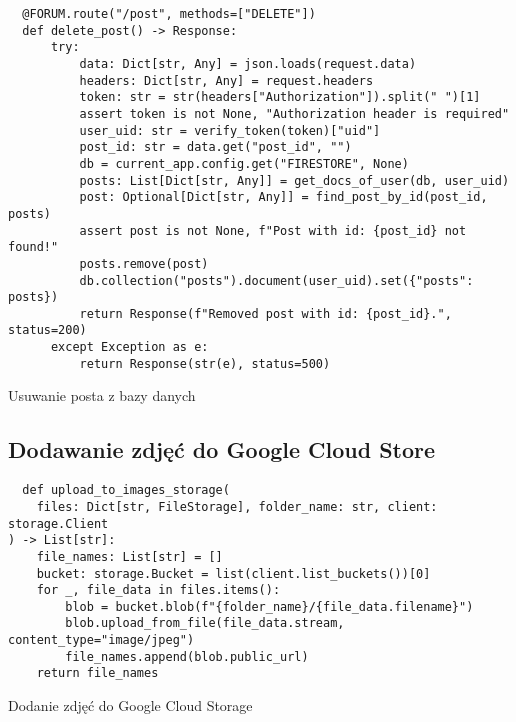 \begin{code}[H]
  \begin{verbatim}
  @FORUM.route("/post", methods=["DELETE"])
  def delete_post() -> Response:
      try:
          data: Dict[str, Any] = json.loads(request.data)
          headers: Dict[str, Any] = request.headers
          token: str = str(headers["Authorization"]).split(" ")[1]
          assert token is not None, "Authorization header is required"
          user_uid: str = verify_token(token)["uid"]
          post_id: str = data.get("post_id", "")
          db = current_app.config.get("FIRESTORE", None)
          posts: List[Dict[str, Any]] = get_docs_of_user(db, user_uid)
          post: Optional[Dict[str, Any]] = find_post_by_id(post_id, posts)
          assert post is not None, f"Post with id: {post_id} not found!"
          posts.remove(post)
          db.collection("posts").document(user_uid).set({"posts": posts})
          return Response(f"Removed post with id: {post_id}.", status=200)
      except Exception as e:
          return Response(str(e), status=500)
  \end{verbatim}
  \caption{Usuwanie posta z bazy danych}
  \label{delete_post_fragment}
\end{code}


\subsection{Dodawanie zdjęć do Google Cloud Store}

\begin{code}[H]
  \begin{verbatim}
  def upload_to_images_storage(
    files: Dict[str, FileStorage], folder_name: str, client: storage.Client
) -> List[str]:
    file_names: List[str] = []
    bucket: storage.Bucket = list(client.list_buckets())[0]
    for _, file_data in files.items():
        blob = bucket.blob(f"{folder_name}/{file_data.filename}")
        blob.upload_from_file(file_data.stream, content_type="image/jpeg")
        file_names.append(blob.public_url)
    return file_names
  \end{verbatim}
  \caption{Dodanie zdjęć do Google Cloud Storage}
  \label{upload_to_images_storage_fragment}
\end{code}

